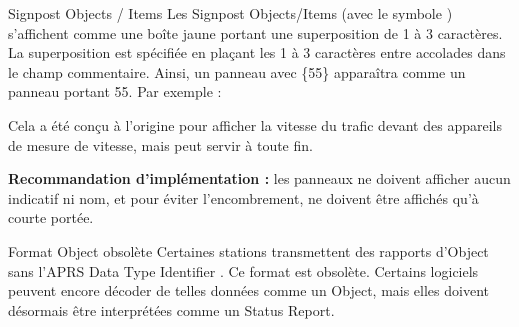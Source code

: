 \begin{aprssideblock}{Signpost Objects / Items}
Les Signpost Objects/Items (avec le symbole )
s'affichent comme une boîte jaune portant une superposition de 1 à
3 caractères. La superposition est spécifiée en plaçant les 1 à
3 caractères entre accolades dans le champ commentaire. Ainsi, un panneau
avec \{55\} apparaîtra comme un panneau portant 55. Par exemple :

Cela a été conçu à l'origine pour afficher la vitesse du trafic devant des
appareils de mesure de vitesse, mais peut servir à toute fin.

\textbf{Recommandation d'implémentation :} les panneaux ne doivent afficher
aucun indicatif ni nom, et pour éviter l'encombrement, ne doivent être
affichés qu'à courte portée.
\end{aprssideblock}

\begin{aprssideblock}{Format Object obsolète}
Certaines stations transmettent des rapports d'Object sans l'APRS Data
Type Identifier \lit{;}. Ce format est obsolète. Certains logiciels
peuvent encore décoder de telles données comme un Object, mais elles
doivent désormais être interprétées comme un Status Report.
\end{aprssideblock}

